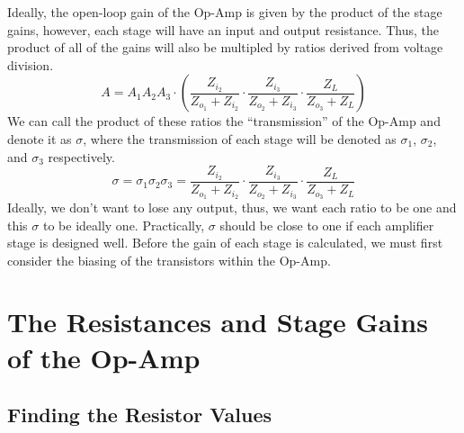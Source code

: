 \documentclass[lettersize,journal]{IEEEtran}
\begin{document}
Ideally, the open-loop gain of the Op-Amp is given by the product of the 
stage gains, however, each stage will have an input and output resistance. Thus, the product 
of all of the gains will also be multipled by ratios derived from voltage division.
\begin{equation}
\label{openLoopGainEq}
A = A_1 A_2 A_3 \cdot \left(\frac{Z_{i_2}}{Z_{o_1} + Z_{i_2}} \cdot \frac{Z_{i_3}}{Z_{o_2} + Z_{i_3}} \cdot \frac{Z_{L}}{Z_{o_3} + Z_L} \right)
\end{equation}
We can call the product of these ratios the ``transmission'' of the 
Op-Amp and denote it as $\sigma$, where the transmission of each 
stage will be denoted as $\sigma_1$, $\sigma_2$, and $\sigma_3$ 
respectively. 
\begin{equation}
\label{transmission}
\sigma = \sigma_1 \sigma_2 \sigma_3 = \frac{Z_{i_2}}{Z_{o_1} + Z_{i_2}} \cdot \frac{Z_{i_3}}{Z_{o_2} + Z_{i_3}} \cdot \frac{Z_{L}}{Z_{o_3} + Z_L}
\end{equation}
Ideally, we don't want to lose any output, thus, 
we want each ratio to be one and this $\sigma$ to be ideally one.
Practically, $\sigma$ should be 
close to one if each amplifier stage is designed well. 
Before the gain of each stage is 
calculated, we must first consider the biasing of the transistors 
within the Op-Amp.

\section{The Resistances and Stage Gains of the Op-Amp}
\subsection{Finding the Resistor Values}
\end{document}

